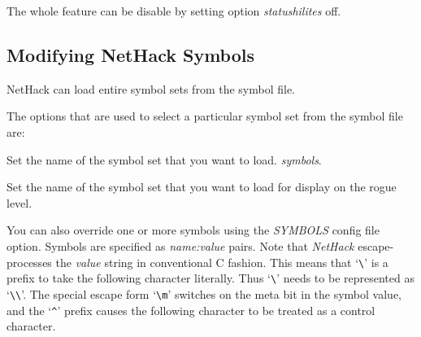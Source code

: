 The whole feature can be disable by setting option {\it statushilites} off.

\subsection*{Modifying NetHack Symbols}

NetHack can load entire symbol sets from the symbol file.

The options that are used to select a particular symbol set from the 
symbol file are:

\blist{}
\item[\ib{symset}]
Set the name of the symbol set that you want to load.
{\it symbols\/}.

\item[\ib{roguesymset}]
Set the name of the symbol set that you want to load for display 
on the rogue level.
\elist

You can also override one or more symbols using the {\it SYMBOLS\/} config 
file option. Symbols are specified as {\it name:value\/} pairs. Note that 
{\it NetHack\/} escape-processes the {\it value\/} string in conventional C
fashion.  This means that `\verb+\+' is a prefix to take the following
character literally.  Thus `\verb+\+' needs to be represented as `\verb+\\+'.
The special escape form
`\verb+\m+' switches on the meta bit in the symbol value, and the
`{\tt \^{}}' prefix causes the following character to be treated as a control
character.

